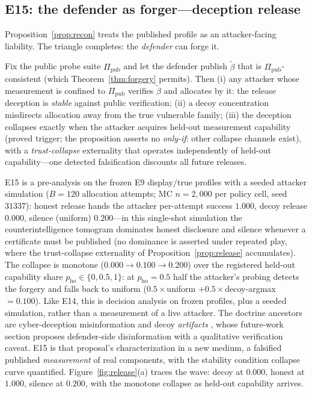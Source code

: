 \subsection{E15: the defender as forger---deception release}\label{sec:release}

Proposition~\ref{prop:recon} treats the published profile as an
attacker-facing liability. The triangle completes: the \emph{defender} can
forge it.

\begin{proposition}\label{prop:release}
Fix the public probe suite $\Pi_{\mathrm{pub}}$ and let the defender publish
$\tilde\beta$ that is $\Pi_{\mathrm{pub}}$-consistent (which
Theorem~\ref{thm:forgery} permits). Then (i) any attacker whose measurement is
confined to $\Pi_{\mathrm{pub}}$ verifies $\tilde\beta$ and allocates by it:
the release deception is \emph{stable} against public verification; (ii) a
decoy concentration misdirects allocation away from the true vulnerable
family; (iii) the deception collapses exactly when the attacker acquires
held-out measurement capability (proved trigger; the proposition asserts no \emph{only-if}:
other collapse channels exist), with a \emph{trust-collapse} externality
that operates independently of held-out capability---one detected
falsification discounts all future releases.
\end{proposition}

E15 is a pre-analysis on the frozen E9 display/true profiles with a
seeded attacker simulation ($B=120$ allocation attempts;
MC $n=2{,}000$ per policy cell, seed $31337$): honest release hands the
attacker per-attempt success $1.000$, decoy release $0.000$, silence
(uniform) $0.200$---in this single-shot simulation the counterintelligence
tomogram dominates honest disclosure and silence whenever a certificate
must be published (no dominance is asserted under repeated play, where
the trust-collapse externality of Proposition~\ref{prop:release}
accumulates). The collapse is monotone
($0.000\to0.100\to0.200$) over the registered held-out capability share
$p_{\mathrm{ho}}\in\{0,0.5,1\}$: at $p_{\mathrm{ho}}=0.5$ half the
attacker's probing detects the forgery and falls back to uniform
($0.5\times$uniform $+0.5\times$decoy-argmax $=0.100$). Like E14, this is decision analysis on
frozen profiles, plus a seeded simulation, rather than a measurement of a
live attacker. The doctrine ancestors are cyber-deception misinformation
\cite{fergusonwalter2017,bodeau2013,perry2025} and decoy \emph{artifacts}
\cite{honeypotagents2026}, whose future-work section proposes defender-side
disinformation with a qualitative verification caveat. E15 is that
proposal's characterization in a new medium, a falsified published
\emph{measurement} of real components, with the stability condition
collapse curve quantified. Figure~\ref{fig:release}(a) traces the wave: decoy
at $0.000$, honest at $1.000$, silence at $0.200$, with the monotone collapse
as held-out capability arrives.

